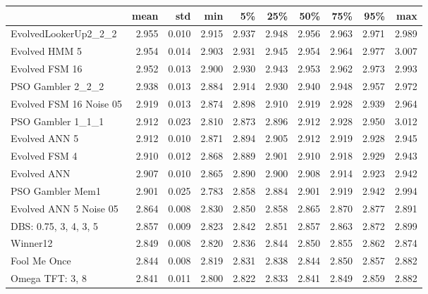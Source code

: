 \begin{tabular}{lrrrrrrrrr}
\toprule
{} &   mean &    std &    min &     5\% &    25\% &    50\% &    75\% &    95\% &    max \\
\midrule
EvolvedLookerUp2\_2\_2    &  2.955 &  0.010 &  2.915 &  2.937 &  2.948 &  2.956 &  2.963 &  2.971 &  2.989 \\
Evolved HMM 5           &  2.954 &  0.014 &  2.903 &  2.931 &  2.945 &  2.954 &  2.964 &  2.977 &  3.007 \\
Evolved FSM 16          &  2.952 &  0.013 &  2.900 &  2.930 &  2.943 &  2.953 &  2.962 &  2.973 &  2.993 \\
PSO Gambler 2\_2\_2       &  2.938 &  0.013 &  2.884 &  2.914 &  2.930 &  2.940 &  2.948 &  2.957 &  2.972 \\
Evolved FSM 16 Noise 05 &  2.919 &  0.013 &  2.874 &  2.898 &  2.910 &  2.919 &  2.928 &  2.939 &  2.964 \\
PSO Gambler 1\_1\_1       &  2.912 &  0.023 &  2.810 &  2.873 &  2.896 &  2.912 &  2.928 &  2.950 &  3.012 \\
Evolved ANN 5           &  2.912 &  0.010 &  2.871 &  2.894 &  2.905 &  2.912 &  2.919 &  2.928 &  2.945 \\
Evolved FSM 4           &  2.910 &  0.012 &  2.868 &  2.889 &  2.901 &  2.910 &  2.918 &  2.929 &  2.943 \\
Evolved ANN             &  2.907 &  0.010 &  2.865 &  2.890 &  2.900 &  2.908 &  2.914 &  2.923 &  2.942 \\
PSO Gambler Mem1        &  2.901 &  0.025 &  2.783 &  2.858 &  2.884 &  2.901 &  2.919 &  2.942 &  2.994 \\
Evolved ANN 5 Noise 05  &  2.864 &  0.008 &  2.830 &  2.850 &  2.858 &  2.865 &  2.870 &  2.877 &  2.891 \\
DBS: 0.75, 3, 4, 3, 5   &  2.857 &  0.009 &  2.823 &  2.842 &  2.851 &  2.857 &  2.863 &  2.872 &  2.899 \\
Winner12                &  2.849 &  0.008 &  2.820 &  2.836 &  2.844 &  2.850 &  2.855 &  2.862 &  2.874 \\
Fool Me Once            &  2.844 &  0.008 &  2.819 &  2.831 &  2.838 &  2.844 &  2.850 &  2.857 &  2.882 \\
Omega TFT: 3, 8         &  2.841 &  0.011 &  2.800 &  2.822 &  2.833 &  2.841 &  2.849 &  2.859 &  2.882 \\
\bottomrule
\end{tabular}
